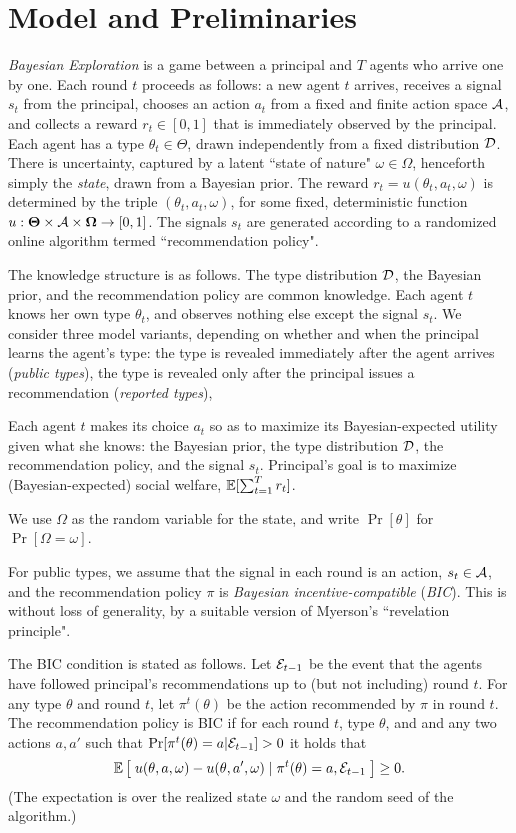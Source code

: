 \section{Model and Preliminaries}

\emph{Bayesian Exploration} is a game between a principal and $T$ agents who arrive one by one. Each round $t$ proceeds as follows: a new agent $t$ arrives, receives a signal $s_t$ from the principal, chooses an action $a_t$ from a fixed and finite action space $\mathcal{A}$, and collects a reward $r_t\in [0,1]$ that is immediately observed by the principal. Each agent has a type $\theta_t\in\varTheta$, drawn independently from a fixed distribution $\mathcal{D}$. There is uncertainty, captured by a latent ``state of nature" $\omega\in \varOmega$, henceforth simply the \emph{state}, drawn from a Bayesian prior. The reward $r_t = u(\theta_t,a_t,\omega)$ is determined by the triple $(\theta_t,a_t,\omega)$, for some fixed, deterministic function
    $u:\bold{\Theta}\times \mathcal{A} \times \bold{\Omega} \to [0,1]$.
The signals $s_t$ are generated according to a randomized online algorithm  termed ``recommendation policy".

The knowledge structure is as follows. The type distribution $\mathcal{D}$, the Bayesian prior, and the recommendation policy are common knowledge. Each agent $t$ knows her own type $\theta_t$, and observes nothing else except the signal $s_t$.  We consider three model variants, depending on whether and when the principal learns the agent's type: the type is revealed immediately after the agent arrives (\emph{public types}), the type is revealed only after the principal issues a recommendation (\emph{reported types}),


Each agent $t$ makes its choice $a_t$ so as to maximize its Bayesian-expected utility given what she knows: the Bayesian prior, the type distribution $\mathcal{D}$, the recommendation policy, and the signal $s_t$. Principal's goal is to maximize (Bayesian-expected) social welfare, \ie $\mathbb{E}[\sum_{t=1}^T r_t]$. 

We use $\Omega$ as the random variable for the state, and write $\Pr[\theta]$ for $\Pr[\Omega=\omega]$. 

For public types, we assume that the signal in each round is an action, \ie $s_t \in \mathcal{A}$, and the recommendation policy $\pi$ is {\em Bayesian incentive-compatible} (\emph{BIC}). This is without loss of generality, by a suitable version of Myerson's ``revelation principle".

The BIC condition is stated as follows. Let $\mathcal{E}_{t-1}$ be the event that the agents have followed principal's recommendations up to (but not including) round $t$. For any type $\theta$ and round $t$, let $\pi^t(\theta)$ be the action recommended by $\pi$ in round $t$. The recommendation policy is BIC if for each round $t$, type $\theta$, and and any two actions $a,a'$ such that $\Pr[\pi^t(\theta) = a|\mathcal{E}_{t-1}] > 0$ it holds that
\[
\mathbb{E}\left[\; u(\theta,a,\omega) - u(\theta,a',\omega) \mid \pi^t(\theta) =a, \mathcal{E}_{t-1}\;\right] \geq 0.
\]
(The expectation is over the realized state $\omega$ and the random seed of the algorithm.)

